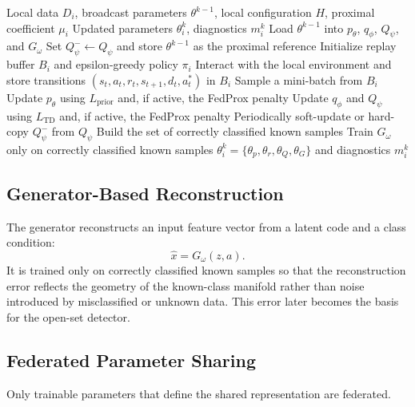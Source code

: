 \documentclass[10pt,twocolumn]{article}
\begin{document}
\begin{algorithm}[t]
\caption{Client-Side CVAE-DQN Local Update with Optional FedProx}
\begin{algorithmic}[1]
\Require Local data $D_i$, broadcast parameters $\theta^{k-1}$, local configuration $H$, proximal coefficient $\mu_i$
\Ensure Updated parameters $\theta_i^k$, diagnostics $m_i^k$
\State Load $\theta^{k-1}$ into $p_\theta$, $q_\phi$, $Q_\psi$, and $G_\omega$
\State Set $Q_\psi^- \gets Q_\psi$ and store $\theta^{k-1}$ as the proximal reference
\State Initialize replay buffer $B_i$ and epsilon-greedy policy $\pi_i$
  \State Interact with the local environment and store transitions $(s_t,a_t,r_t,s_{t+1},d_t,a_t^\ast)$ in $B_i$
    \State Sample a mini-batch from $B_i$
    \State Update $p_\theta$ using $L_{\mathrm{prior}}$ and, if active, the FedProx penalty
    \State Update $q_\phi$ and $Q_\psi$ using $L_{\mathrm{TD}}$ and, if active, the FedProx penalty
    \State Periodically soft-update or hard-copy $Q_\psi^-$ from $Q_\psi$
  \EndIf
\EndFor
\State Build the set of correctly classified known samples
  \State Train $G_\omega$ only on correctly classified known samples
\EndIf
\State \Return $\theta_i^k = \{\theta_p,\theta_r,\theta_Q,\theta_G\}$ and diagnostics $m_i^k$
\end{algorithmic}
\end{algorithm}

\subsection{Generator-Based Reconstruction}
The generator reconstructs an input feature vector from a latent code and a class condition:
\[
\hat{x} = G_\omega(z,a).
\]
It is trained only on correctly classified known samples so that the reconstruction error reflects the geometry of the known-class manifold rather than noise introduced by misclassified or unknown data. This error later becomes the basis for the open-set detector.

\subsection{Federated Parameter Sharing}
Only trainable parameters that define the shared representation are federated.
\end{document}
